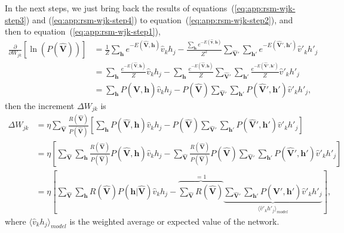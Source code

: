 In the next steps, we just bring back the results of equations~(\ref{eq:app:rsm-wjk-step3}) and (\ref{eq:app:rsm-wjk-step4}) to equation~(\ref{eq:app:rsm-wjk-step2}), and then to equation~(\ref{eq:app:rsm-wjk-step1}),
\begin{align}
    \frac{\partial}{\partial W_{jk}} \left[ \ln\left(P(\mathbf{\hat{V}})\right) \right] &= \frac{1}{Z} \sum_{\mathbf{h}} e^{-E(\mathbf{\hat{V}}, \mathbf{h})} \hat{v}_{k} h_{j} - \frac{\sum_{\mathbf{h}} e^{-E(\mathbf{\hat{v}}, \mathbf{h})}}{Z^{2}} \sum_{\mathbf{\hat{V}}'} \sum_{\mathbf{h}'} e^{-E(\mathbf{\hat{V}}', \mathbf{h}')} \hat{v}'_{k} h'_{j} \nonumber \\ %
    &= \sum_{\mathbf{h}} \frac{e^{-E(\mathbf{\hat{V}}, \mathbf{h})}}{Z} \hat{v}_{k} h_{j} - \sum_{\mathbf{h}} \frac{e^{-E(\mathbf{\hat{V}}, \mathbf{h})}}{Z} \sum_{\mathbf{\hat{V}}'} \sum_{\mathbf{h}'} \frac{e^{-E(\mathbf{\hat{V}}', \mathbf{h}')}}{Z} \hat{v}'_{k} h'_{j} \nonumber \\ %
    \label{eq:app:rsm-wjk-step5}
    &= \sum_{\mathbf{h}} P(\mathbf{\hat{V}}, \mathbf{h}) \hat{v}_{k} h_{j} - P(\mathbf{\hat{V}}) \sum_{\mathbf{\hat{V}}'} \sum_{\mathbf{h}'} P(\mathbf{\hat{V}}', \mathbf{h}') \hat{v}'_{k} h'_{j},
\end{align}
then the increment $\Delta W_{jk}$ is
\begin{align}
    \Delta W_{jk} &= \eta \sum_{\mathbf{\hat{V}}} \frac{R(\mathbf{\hat{V}})}{P(\mathbf{\hat{V}})} \left[ \sum_{\mathbf{h}} P(\mathbf{\hat{V}}, \mathbf{h}) \hat{v}_{k} h_{j} - P(\mathbf{\hat{V}}) \sum_{\mathbf{\hat{V}}'} \sum_{\mathbf{h}'} P(\mathbf{\hat{V}}', \mathbf{h}') \hat{v}'_{k} h'_{j} \right] \nonumber \\ %
    &= \eta \left[ \sum_{\mathbf{\hat{V}}} \sum_{\mathbf{h}} \frac{R(\mathbf{\hat{V}})}{P(\mathbf{\hat{V}})} P(\mathbf{\hat{V}}, \mathbf{h}) \hat{v}_{k} h_{j} - \sum_{\mathbf{\hat{V}}} \frac{R(\mathbf{\hat{V}})}{P(\mathbf{\hat{V}})} P(\mathbf{\hat{V}}) \sum_{\mathbf{\hat{V}}'} \sum_{\mathbf{h}'} P(\mathbf{\hat{V}}', \mathbf{h}') \hat{v}'_{k} h'_{j} \right] \nonumber \\ %
    \label{eq:app:rsm-wjk-step6}
    &= \eta \left[ \sum_{\mathbf{\hat{V}}} \sum_{\mathbf{h}} R(\mathbf{\hat{V}}) P(\mathbf{h}|\mathbf{\hat{V}}) \hat{v}_{k} h_{j} - \overbrace{\sum_{\mathbf{\hat{V}}} R(\mathbf{\hat{V}})}^{=1} \underbrace{\sum_{\mathbf{\hat{V}}'} \sum_{\mathbf{h}'} P(\mathbf{\hat{V}}', \mathbf{h}') \hat{v}'_{k} h'_{j}}_{\langle \hat{v}'_{k} h'_{j} \rangle_{model}} \right], 
\end{align}
where $\langle \hat{v}_{k} h_{j} \rangle_{model}$ is the weighted average or expected value of the network.

